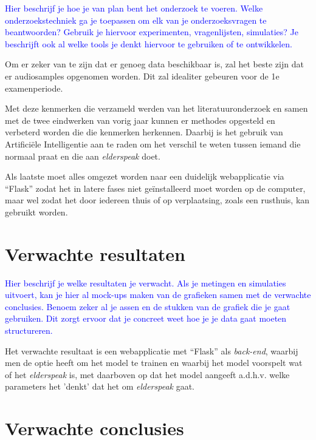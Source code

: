 \textcolor{blue}{Hier beschrijf je hoe je van plan bent het onderzoek te voeren. Welke onderzoekstechniek ga je toepassen om elk van je onderzoeksvragen te beantwoorden? Gebruik je hiervoor experimenten, vragenlijsten, simulaties? Je beschrijft ook al welke tools je denkt hiervoor te gebruiken of te ontwikkelen.}

Om er zeker van te zijn dat er genoeg data beschikbaar is, zal het beste zijn dat er audiosamples opgenomen worden. Dit zal idealiter gebeuren voor de 1e examenperiode. 

Met deze kenmerken die verzameld werden van het literatuuronderzoek en samen met de twee eindwerken van vorig jaar kunnen er  methodes opgesteld en verbeterd worden die die kenmerken herkennen. Daarbij is het gebruik van Artificiële Intelligentie aan te raden om het verschil te weten tussen iemand die normaal praat en die aan \textit{elderspeak} doet.

Als laatste moet alles omgezet worden naar een duidelijk webapplicatie via ``Flask'' zodat het in latere fases niet geïnstalleerd moet worden op de computer, maar wel zodat het door iedereen thuis of op verplaatsing, zoals een rusthuis, kan gebruikt worden.


\section{Verwachte resultaten}
\label{sec:verwachte_resultaten}

\textcolor{blue}{Hier beschrijf je welke resultaten je verwacht. Als je metingen en simulaties uitvoert, kan je hier al mock-ups maken van de grafieken samen met de verwachte conclusies. Benoem zeker al je assen en de stukken van de grafiek die je gaat gebruiken. Dit zorgt ervoor dat je concreet weet hoe je je data gaat moeten structureren.}

Het verwachte resultaat is een webapplicatie met ``Flask'' als \textit{back-end}, waarbij men de optie heeft om het model te trainen en waarbij het model voorspelt wat of het \textit{elderspeak} is, met daarboven op dat het model aangeeft a.d.h.v. welke parameters het 'denkt' dat het om \textit{elderspeak} gaat.


\section{Verwachte conclusies}
\label{sec:verwachte_conclusies}

